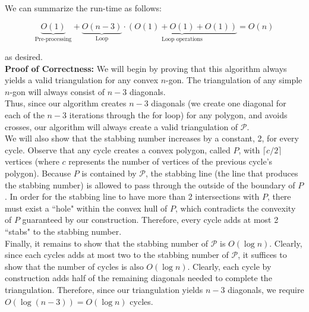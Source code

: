 \documentclass[11pt]{article}
\begin{document}
\begin{enumerate}
    We can summarize the run-time as follows:

    \[\underbrace{O(1)}_{\text{Pre-processing}} + \underbrace{O(n-3)}_{\text{Loop}} \cdot \underbrace{(O(1) + O(1) + O(1))}_{\text{Loop operations}} = O(n)\]

    as desired. \\

    \textbf{Proof of Correctness: } We will begin by proving that this algorithm always yields a valid triangulation for any convex $n$-gon. The triangulation of any simple $n$-gon will always consist of $n-3$ diagonals. \\
    
    Thus, since our algorithm creates $n-3$ diagonals (we create one diagonal for each of the $n-3$ iterations through the for loop) for any polygon, and avoids crosses, our algorithm will always create a valid triangulation of $\mathcal{P}.$ \\

    We will also show that the stabbing number increases by a constant, 2, for every cycle. Observe that any cycle creates a convex polygon, called $P$, with $\lceil c/2 \rceil$ vertices (where $c$ represents the number of vertices of the previous cycle's polygon). Because $P$ is contained by $\mathcal{P}$, the stabbing line (the line that produces the stabbing number) is allowed to pass through the outside of the boundary of $P$. In order for the stabbing line to have more than 2 intersections with $P$, there must exist a ``hole" within the convex hull of $P$, which contradicts the convexity of $P$ guaranteed by our construction. Therefore, every cycle adds at most 2 ``stabs" to the stabbing number. \\

    Finally, it remains to show that the stabbing number of $\mathcal{P}$ is $O(\log n)$. Clearly, since each cycles adds at most two to the stabbing number of $\mathcal{P}$, it suffices to show that the number of cycles is also $O(\log n)$. Clearly, each cycle by construction adds half of the remaining diagonals needed to complete the triangulation. Therefore, since our triangulation yields $n-3$ diagonals, we require $O(\log(n-3)) = O(\log n)$ cycles. \\
    

\end{enumerate}
\end{document}
